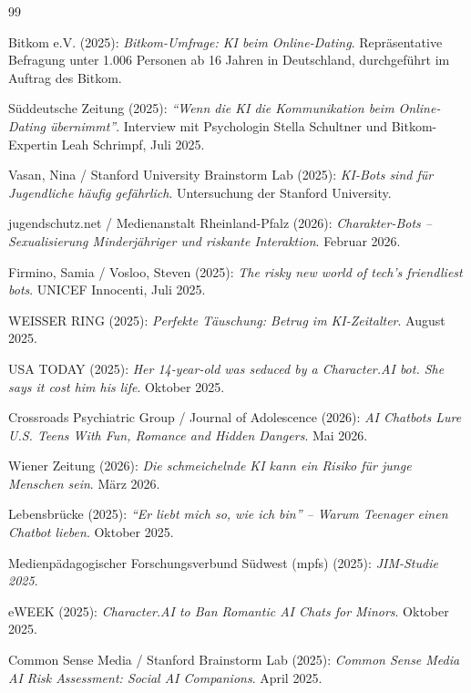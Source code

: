\documentclass[12pt,a4paper,oneside]{scrartcl}
\begin{document}
	\newpage
	\begin{thebibliography}{99}
		
		Bitkom e.V. (2025): \emph{Bitkom-Umfrage: KI beim Online-Dating}. Repräsentative Befragung unter 1.006 Personen ab 16 Jahren in Deutschland, durchgeführt im Auftrag des Bitkom.
		
		Süddeutsche Zeitung (2025): \emph{``Wenn die KI die Kommunikation beim Online-Dating übernimmt''}. Interview mit Psychologin Stella Schultner und Bitkom-Expertin Leah Schrimpf, Juli 2025.
		
		Vasan, Nina / Stanford University Brainstorm Lab (2025): \emph{KI-Bots sind für Jugendliche häufig gefährlich}. Untersuchung der Stanford University.
		
		jugendschutz.net / Medienanstalt Rheinland-Pfalz (2026): \emph{Charakter-Bots – Sexualisierung Minderjähriger und riskante Interaktion}. Februar 2026.
		
		Firmino, Samia / Vosloo, Steven (2025): \emph{The risky new world of tech's friendliest bots}. UNICEF Innocenti, Juli 2025.
		
		WEISSER RING (2025): \emph{Perfekte Täuschung: Betrug im KI-Zeitalter}. August 2025.
		
		USA TODAY (2025): \emph{Her 14-year-old was seduced by a Character.AI bot. She says it cost him his life}. Oktober 2025.
		
		Crossroads Psychiatric Group / Journal of Adolescence (2026): \emph{AI Chatbots Lure U.S. Teens With Fun, Romance and Hidden Dangers}. Mai 2026.
		
		Wiener Zeitung (2026): \emph{Die schmeichelnde KI kann ein Risiko für junge Menschen sein}. März 2026.
		
		Lebensbrücke (2025): \emph{``Er liebt mich so, wie ich bin'' – Warum Teenager einen Chatbot lieben}. Oktober 2025.
		
		Medienpädagogischer Forschungsverbund Südwest (mpfs) (2025): \emph{JIM-Studie 2025}.
		
		eWEEK (2025): \emph{Character.AI to Ban Romantic AI Chats for Minors}. Oktober 2025.
		
		Common Sense Media / Stanford Brainstorm Lab (2025): \emph{Common Sense Media AI Risk Assessment: Social AI Companions}. April 2025.
		

\end{thebibliography}
\end{document}
